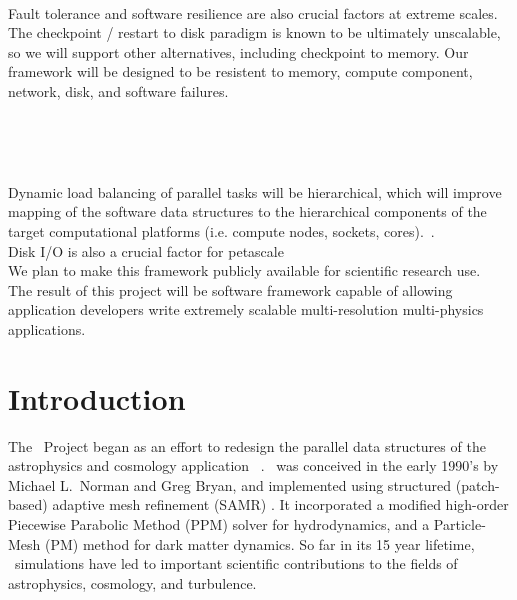 \documentclass{article}
\begin{document}
\ \\  Fault tolerance and software
resilience are also crucial factors at extreme scales.  The checkpoint
/ restart to disk paradigm is known to be ultimately unscalable, so we
will support other alternatives, including checkpoint to memory.
Our framework will be designed to be resistent to memory, compute
component, network, disk, and software failures.

\ \\ 


\ \\ 
%

%
Dynamic load balancing of parallel tasks will be hierarchical, which
will improve mapping of the software data structures to the
hierarchical components of the target computational platforms (i.e.
compute nodes, sockets, cores).~\cite{@@@LAN-DLB}.
%
%
%
\ \\ 
Disk I/O is also a crucial factor for petascale 
%
\ \\  We plan to make this framework publicly
available for scientific research use.
%
\ \\  
The result of this project will be software framework capable of
allowing application developers write extremely scalable
multi-resolution multi-physics applications.

\section{Introduction} \label{s:intro}


The \cello\ Project began as an effort to redesign the parallel data
structures of the astrophysics and cosmology application \enzo\
\cite{@@@ENZO}.  \enzo\ was conceived in the early 1990's by Michael
L.~Norman and Greg Bryan, and implemented using structured
(patch-based) adaptive mesh refinement (SAMR) \cite{@@@SAMR}.  It
incorporated a modified high-order Piecewise Parabolic Method (PPM)
solver \cite{@@@PPM} for hydrodynamics, and a Particle-Mesh (PM)
method \cite{@@@PM} for dark matter dynamics.  So far in its 15 year
lifetime, \enzo\ simulations have led to important scientific
contributions to the fields of astrophysics, cosmology, and
turbulence.
\end{document}
